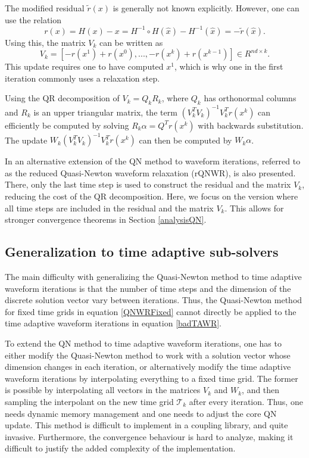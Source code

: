 The modified residual $\tilde{r}(x)$ is generally not known explicitly. However, one can use the relation 
\begin{equation*}
	r(x) = H(x)-x = H^{-1} \circ H(\hat{x}) -  H^{-1}(\hat{x}) = -\tilde{r}(\hat{x}). \label{residuals}
\end{equation*} 
Using this, the matrix $V_k$ can be written as 
\begin{equation*}
	V_k = [-r(x^1)+r(x^0), ... , -r(x^k)+r(x^{k-1})]  \in R^{nd  \times k}. 
\end{equation*} 
This update requires one to have computed $x^1$, which is why one in the  first iteration commonly uses  a relaxation step.

Using the QR decomposition of $V_k = Q_k R_k$, where $Q_k$ has orthonormal columns and $R_k$ is an upper triangular matrix, the term $(V_k^TV_k)^{-1}V_k^T r(x^k)$ can efficiently be computed by solving $R_k \alpha = Q^T r(x^k)$ with backwards substitution. The update $W_k(V_k^TV_k)^{-1}V_k^T r(x^k) $ can then be computed by $W_k \alpha$. 

In \cite{RuUe21} an alternative extension of the QN method to waveform iterations, referred to as the reduced Quasi-Newton waveform relaxation (rQNWR), is also presented. There, only the last time step is used to construct the residual and the matrix $V_k$, reducing the cost of the QR decomposition. Here, we focus on the version where all time steps are included in the residual and the matrix $V_k$. This allows for stronger convergence theorems in Section \ref{analysisQN}.

\subsection{Generalization to time adaptive sub-solvers}\label{QNWRTA}

The main difficulty with generalizing the Quasi-Newton method to time adaptive waveform iterations is that the number of time steps and the dimension of the discrete solution vector vary between iterations. Thus, the Quasi-Newton method for fixed time grids in equation \eqref{QNWRFixed} cannot directly be applied to the time adaptive waveform iterations in equation \eqref{badTAWR}. 

To extend the QN method to time adaptive waveform iterations, one has to either modify the Quasi-Newton method to work with a solution vector whose dimension changes in each iteration, or alternatively modify the time adaptive waveform iterations by interpolating everything to a fixed time grid. The former is possible by interpolating all vectors in the matrices $V_k$ and $W_k$, and then sampling the interpolant on the new time grid $\mathcal{T}_k$ after every iteration. Thus, one needs dynamic memory management and one needs to adjust the core QN update. This method is difficult to implement in a coupling library, and quite invasive. Furthermore, the convergence behaviour is hard to analyze, making it difficult to justify the added complexity of the implementation.

